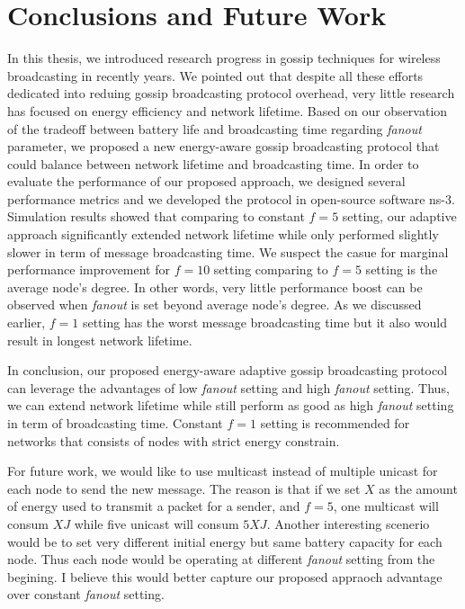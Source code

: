\chapter{Conclusions and Future Work}

In this thesis, we introduced research progress in gossip techniques for wireless broadcasting in recently years. We pointed out that despite all these efforts dedicated into reduing gossip broadcasting protocol overhead, very little research has focused on energy efficiency and network lifetime. Based on our observation of the tradeoff between battery life and broadcasting time regarding \emph{fanout} parameter, we proposed a new energy-aware gossip broadcasting protocol that could balance between network lifetime and broadcasting time. In order to evaluate the performance of our proposed approach, we designed several performance metrics and we developed the protocol in open-source software ns-3. Simulation results showed that comparing to constant $f=5$ setting, our adaptive approach significantly extended network lifetime while only performed slightly slower in term of message broadcasting time. We suspect the casue for marginal performance improvement for $f=10$ setting comparing to $f=5$ setting is the average node's degree. In other words, very little performance boost can be observed when \emph{fanout} is set beyond average node's degree. As we discussed earlier, $f=1$ setting has the worst message broadcasting time but it also would result in longest network lifetime. 

In conclusion, our proposed energy-aware adaptive gossip broadcasting protocol can leverage the advantages of low \emph{fanout} setting and high \emph{fanout} setting. Thus, we can extend network lifetime while still perform as good as high \emph{fanout} setting in term of broadcasting time. Constant $f=1$ setting is recommended for networks that consists of nodes with strict energy constrain. 

For future work, we would like to use multicast instead of multiple unicast for each node to send the new message. The reason is that if we set $X$ as the amount of energy used to transmit a packet for a sender, and $f=5$, one multicast will consum $X J$ while five unicast will consum $5X J$. Another interesting scenerio would be to set very different initial energy but same battery capacity for each node. Thus each node would be operating at different \emph{fanout} setting from the begining. I believe this would better capture our proposed appraoch advantage over constant \emph{fanout} setting.